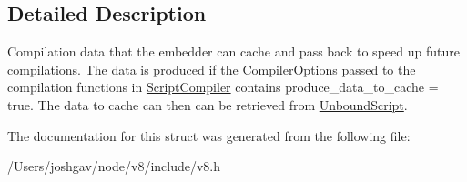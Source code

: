 \subsection{Detailed Description}
Compilation data that the embedder can cache and pass back to speed up future compilations. The data is produced if the Compiler\+Options passed to the compilation functions in \hyperlink{classv8_1_1_script_compiler}{Script\+Compiler} contains produce\+\_\+data\+\_\+to\+\_\+cache = true. The data to cache can then can be retrieved from \hyperlink{classv8_1_1_unbound_script}{Unbound\+Script}. 

The documentation for this struct was generated from the following file\+:\begin{DoxyCompactItemize}
\item 
/\+Users/joshgav/node/v8/include/v8.\+h\end{DoxyCompactItemize}
